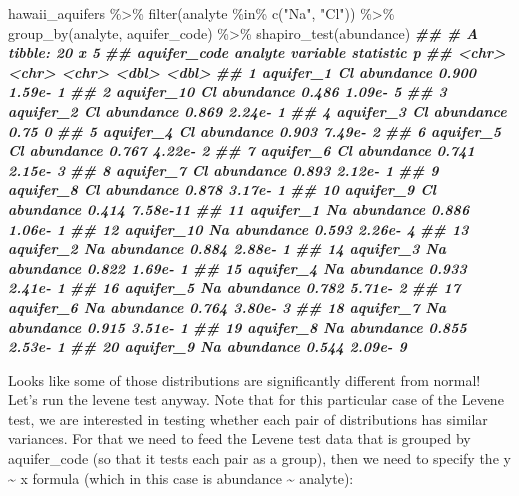 \documentclass[
]{krantz}
\newenvironment{Shaded}{\begin{snugshade}}{\end{snugshade}}
\newcommand{\DocumentationTok}[1]{\textcolor[rgb]{0.56,0.35,0.01}{\textbf{\textit{#1}}}}
\newcommand{\FunctionTok}[1]{\textcolor[rgb]{0.00,0.00,0.00}{#1}}
\newcommand{\NormalTok}[1]{#1}
\newcommand{\SpecialCharTok}[1]{\textcolor[rgb]{0.00,0.00,0.00}{#1}}
\newcommand{\StringTok}[1]{\textcolor[rgb]{0.31,0.60,0.02}{#1}}
\begin{document}
\begin{Shaded}
\begin{Highlighting}[]
\NormalTok{hawaii\_aquifers }\SpecialCharTok{\%\textgreater{}\%}
  \FunctionTok{filter}\NormalTok{(analyte }\SpecialCharTok{\%in\%} \FunctionTok{c}\NormalTok{(}\StringTok{"Na"}\NormalTok{, }\StringTok{"Cl"}\NormalTok{)) }\SpecialCharTok{\%\textgreater{}\%}
  \FunctionTok{group\_by}\NormalTok{(analyte, aquifer\_code) }\SpecialCharTok{\%\textgreater{}\%}
  \FunctionTok{shapiro\_test}\NormalTok{(abundance)}
\DocumentationTok{\#\# \# A tibble: 20 x 5}
\DocumentationTok{\#\#    aquifer\_code analyte variable  statistic        p}
\DocumentationTok{\#\#    \textless{}chr\textgreater{}        \textless{}chr\textgreater{}   \textless{}chr\textgreater{}         \textless{}dbl\textgreater{}    \textless{}dbl\textgreater{}}
\DocumentationTok{\#\#  1 aquifer\_1    Cl      abundance     0.900 1.59e{-} 1}
\DocumentationTok{\#\#  2 aquifer\_10   Cl      abundance     0.486 1.09e{-} 5}
\DocumentationTok{\#\#  3 aquifer\_2    Cl      abundance     0.869 2.24e{-} 1}
\DocumentationTok{\#\#  4 aquifer\_3    Cl      abundance     0.75  0       }
\DocumentationTok{\#\#  5 aquifer\_4    Cl      abundance     0.903 7.49e{-} 2}
\DocumentationTok{\#\#  6 aquifer\_5    Cl      abundance     0.767 4.22e{-} 2}
\DocumentationTok{\#\#  7 aquifer\_6    Cl      abundance     0.741 2.15e{-} 3}
\DocumentationTok{\#\#  8 aquifer\_7    Cl      abundance     0.893 2.12e{-} 1}
\DocumentationTok{\#\#  9 aquifer\_8    Cl      abundance     0.878 3.17e{-} 1}
\DocumentationTok{\#\# 10 aquifer\_9    Cl      abundance     0.414 7.58e{-}11}
\DocumentationTok{\#\# 11 aquifer\_1    Na      abundance     0.886 1.06e{-} 1}
\DocumentationTok{\#\# 12 aquifer\_10   Na      abundance     0.593 2.26e{-} 4}
\DocumentationTok{\#\# 13 aquifer\_2    Na      abundance     0.884 2.88e{-} 1}
\DocumentationTok{\#\# 14 aquifer\_3    Na      abundance     0.822 1.69e{-} 1}
\DocumentationTok{\#\# 15 aquifer\_4    Na      abundance     0.933 2.41e{-} 1}
\DocumentationTok{\#\# 16 aquifer\_5    Na      abundance     0.782 5.71e{-} 2}
\DocumentationTok{\#\# 17 aquifer\_6    Na      abundance     0.764 3.80e{-} 3}
\DocumentationTok{\#\# 18 aquifer\_7    Na      abundance     0.915 3.51e{-} 1}
\DocumentationTok{\#\# 19 aquifer\_8    Na      abundance     0.855 2.53e{-} 1}
\DocumentationTok{\#\# 20 aquifer\_9    Na      abundance     0.544 2.09e{-} 9}
\end{Highlighting}
\end{Shaded}

Looks like some of those distributions are significantly different from normal! Let's run the levene test anyway. Note that for this particular case of the Levene test, we are interested in testing whether each pair of distributions has similar variances. For that we need to feed the Levene test data that is grouped by aquifer\_code (so that it tests each pair as a group), then we need to specify the y \textasciitilde{} x formula (which in this case is abundance \textasciitilde{} analyte):
\end{document}
